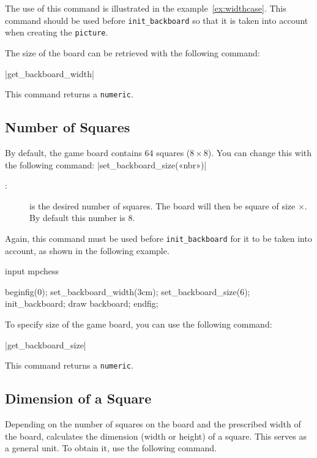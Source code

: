 \documentclass[english]{ltxdoc}
\begin{document}
The use of this command is illustrated in the example~\ref{ex:widthcase}. This
command should be used before \lstinline+init_backboard+ so that it is taken
into account when creating the \lstinline+picture+. 
\bigskip

The size of the board can be retrieved with the following command:

\commande|get_backboard_width|\smallskip{}

This command returns a \lstinline+numeric+.

\subsection{Number of Squares}

By default, the game board contains 64 squares ($8\times 8$). You can change
this with the following command: 
\commande|set_backboard_size(«nbr»)|
\smallskip{}

\begin{description}
  \item[:] is the desired number of squares. The board will then be
  square of size $\times$. By default this number is 8. 
\end{description}

Again, this command must be used before \lstinline+init_backboard+ for it to be
taken into account, as shown in the following example. 

\begin{ExempleMP}[label=ex:widthcase]
input mpchess

beginfig(0);
set_backboard_width(3cm);
set_backboard_size(6);
init_backboard;
draw backboard;
endfig;
\end{ExempleMP}

To specify size of the game board, you can use the following command:
 

\commande|get_backboard_size|\smallskip{}

This command returns a \lstinline+numeric+.

\subsection{Dimension of a Square}

Depending on the number of squares on the board and the prescribed width of the board, \mpchess calculates the dimension (width or height) of a square. This
serves as a general unit. To obtain it, use the following command.
\end{document}
